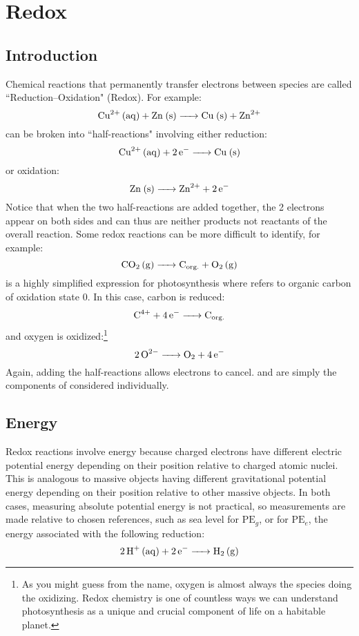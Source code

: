 \chapter{Redox}\label{redox}
\section{Introduction}
Chemical reactions that permanently transfer electrons between species are called ``Reduction–Oxidation" (Redox). For example:
\[\ce{Cu^2+ (aq) + Zn (s) -> Cu (s) + Zn^2+}\]
can be broken into ``half-reactions" involving either reduction:
\[\ce{Cu^2+ (aq) + 2e- -> Cu (s)}\]
or oxidation:
\[\ce{Zn (s) -> Zn^2+ + 2e-}\]
Notice that when the two half-reactions are added together, the 2 electrons appear on both sides and can thus are neither products not reactants of the overall reaction. Some redox reactions can be more difficult to identify, for example:
\[\ce{CO2 (g) -> C_{\text{org.}} + O2 (g)}\]
is a highly simplified expression for photosynthesis where  refers to organic carbon of oxidation state 0. In this case, carbon is reduced:
\[\ce{C^4+ + 4e- -> C_{\text{org.}}}\]
and oxygen is oxidized:\footnote{As you might guess from the name, oxygen is almost always the species doing the oxidizing. Redox chemistry is one of countless ways we can understand photosynthesis as a unique and crucial component of life on a habitable planet.}
\[\ce{2O^2- -> O2 + 4e-}\]
Again, adding the half-reactions allows electrons to cancel.  and  are simply the components of  considered individually.
\section{Energy}
Redox reactions involve energy because charged electrons have different electric potential energy depending on their position relative to charged atomic nuclei. This is analogous to massive objects having different gravitational potential energy depending on their position relative to other massive objects. In both cases, measuring absolute potential energy is not practical, so measurements are made relative to chosen references, such as sea level for $\text{PE}_g$, or for $\text{PE}_e$, the energy associated with the following reduction:
\[\ce{2H+ (aq) + 2e- -> H2 (g)}\]
